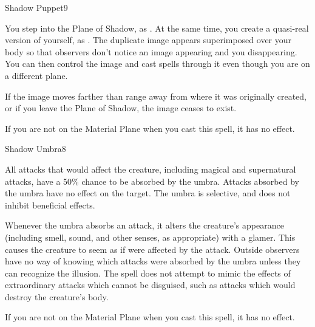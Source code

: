 \begin{spellsection}{Shadow Puppet}{9}
\begin{spellheader}
\end{spellheader}
\begin{spellcontent}
    \spelleffect You step into the Plane of Shadow, as . At the same time, you create a quasi-real version of yourself, as . The duplicate image appears superimposed over your body so that observers don't notice an image appearing and you disappearing. You can then control the image and cast spells through it even though you are on a different plane.
    \spelldur \durmed
\end{spellcontent}
\begin{spellfooter}
    \spellnotes If the image moves farther than \rnglong range away from where it was originally created, or if you leave the Plane of Shadow, the image ceases to exist.

    If you are not on the Material Plane when you cast this spell, it has no effect.
\end{spellfooter}
\end{spellsection}

\begin{spellsection}{Shadow Umbra}{8}
\begin{spellheader}
    \begin{spelltargetinginfo}
    \end{spelltargetinginfo}
\end{spellheader}
\begin{spellcontent}
    \begin{spelleffects}
        \spelleffect All attacks that would affect the creature, including magical and supernatural attacks, have a 50\% chance to be absorbed by the umbra. Attacks absorbed by the umbra have no effect on the target. The umbra is selective, and does not inhibit beneficial effects.

        Whenever the umbra absorbs an attack, it alters the creature's appearance (including smell, sound, and other senses, as appropriate) with a glamer. This causes the creature to seem as if were affected by the attack. Outside observers have no way of knowing which attacks were absorbed by the umbra unless they can recognize the illusion. The spell does not attempt to mimic the effects of extraordinary attacks which cannot be disguised, such as attacks which would destroy the creature's body.
        \spelldur \durshort
    \end{spelleffects}
\end{spellcontent}
\begin{spellfooter}
    \spellnotes If you are not on the Material Plane when you cast this spell, it has no effect.
\end{spellfooter}
\end{spellsection}

